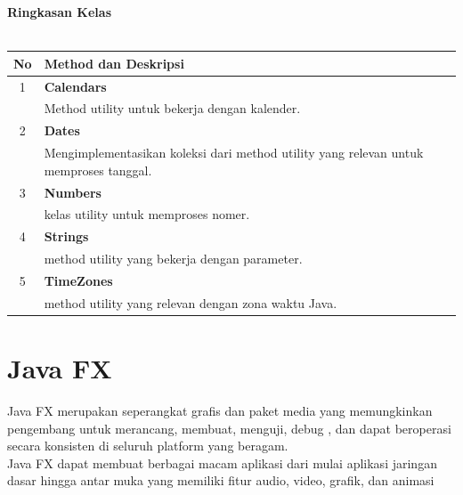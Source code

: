 	\noindent \textbf{Ringkasan Kelas}\cite{ical}\\ \\
	\begin{tabular}{|c|p{12cm}|}
		\hline
		\textbf{No} & \textbf{Method dan Deskripsi} \\ \hline \hline
		1 & \textbf{Calendars}\\
			&	Method utility untuk bekerja dengan kalender.\\ \hline
		2 & \textbf{Dates}\\
			&	Mengimplementasikan koleksi dari method utility yang relevan untuk memproses tanggal. \\ \hline
		3 & \textbf{Numbers}\\
			&	kelas utility untuk memproses nomer. \\ \hline
		4 & \textbf{Strings}\\
			&	method utility yang bekerja dengan parameter. \\ \hline
		5 & \textbf{TimeZones}\\
			&	method utility yang relevan dengan zona waktu Java. \\ \hline
		\end{tabular}

\section{Java FX}
Java FX merupakan seperangkat grafis dan paket media yang memungkinkan pengembang untuk merancang, membuat, menguji, debug , dan dapat beroperasi secara konsisten di seluruh platform yang beragam.\\
Java FX dapat membuat berbagai macam aplikasi dari mulai aplikasi jaringan dasar hingga antar muka yang memiliki fitur audio, video, grafik, dan animasi



